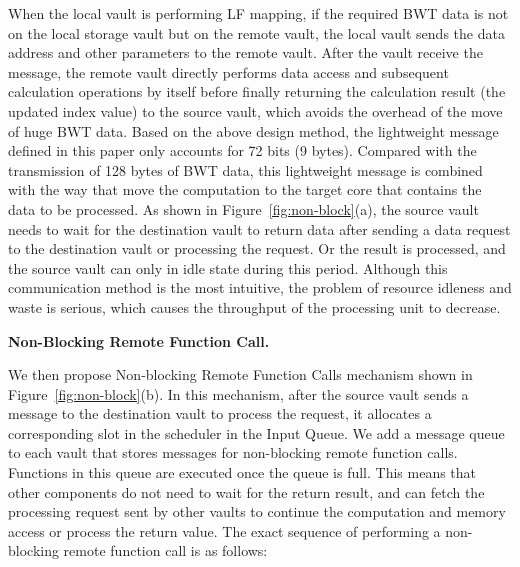 \documentclass[9pt,conference]{IEEEtran}
\begin{document}
When the local vault is performing LF mapping, if the required BWT data is not on the local storage vault but on the remote vault, the local vault sends the data address and other parameters to the remote vault. After the vault receive the message, the remote vault directly performs data access and subsequent calculation operations by itself before finally returning the calculation result (the updated index value) to the source vault, which avoids the overhead of the move of huge BWT data. Based on the above design method, the lightweight message defined in this paper only accounts for 72 bits (9 bytes). Compared with the transmission of 128 bytes of BWT data, this lightweight message is combined with the way that move the computation to the target core that contains the data to be processed. As shown in Figure~\ref{fig:non-block}(a), the source vault needs to wait for the destination vault to return data after sending a data request to the destination vault or processing the request. Or the result is processed, and the source vault can only in idle state during this period. Although this communication method is the most intuitive, the problem of resource idleness and waste is serious, which causes the throughput of the processing unit to decrease.

\textbf{Non-Blocking Remote Function Call.} 

We then propose Non-blocking Remote Function Calls mechanism shown in Figure~\ref{fig:non-block}(b). In this mechanism, after the source vault sends a message to the destination vault to process the request, it allocates a corresponding slot in the scheduler in the Input Queue. We add a message queue to each vault that stores messages for non-blocking remote function calls. Functions in this queue are executed once the queue is full. This means that other components do not need to wait for the return result, and can fetch the processing request sent by other vaults to continue the computation and memory access or process the return value. The exact sequence of performing a non-blocking remote function call is as follows:
\end{document}
